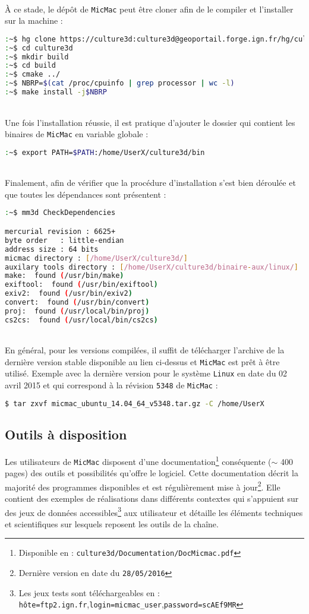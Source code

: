 \documentclass[a4paper,10pt]{article} %
\begin{document}
~\\
À ce stade, le dépôt de {\tt MicMac} peut être cloner afin de le compiler et l'installer sur la machine :
\begin{lstlisting}[language=bash]
:~$ hg clone https://culture3d:culture3d@geoportail.forge.ign.fr/hg/culture3d
:~$ cd culture3d
:~$ mkdir build
:~$ cd build
:~$ cmake ../
:~$ NBRP=$(cat /proc/cpuinfo | grep processor | wc -l)
:~$ make install -j$NBRP
\end{lstlisting}
~\\
Une fois l'installation réussie, il est pratique d'ajouter le dossier qui contient les binaires de {\tt MicMac} en variable globale :
\begin{lstlisting}[language=bash]
:~$ export PATH=$PATH:/home/UserX/culture3d/bin
\end{lstlisting}
~\\
Finalement, afin de vérifier que la procédure d’installation s'est bien déroulée et que toutes les dépendances sont présentent :
\begin{lstlisting}[language=bash]
:~$ mm3d CheckDependencies

mercurial revision : 6625+
byte order   : little-endian
address size : 64 bits
micmac directory : [/home/UserX/culture3d/]
auxilary tools directory : [/home/UserX/culture3d/binaire-aux/linux/]
make:  found (/usr/bin/make)
exiftool:  found (/usr/bin/exiftool)
exiv2:  found (/usr/bin/exiv2)
convert:  found (/usr/bin/convert)
proj:  found (/usr/local/bin/proj)
cs2cs:  found (/usr/local/bin/cs2cs)
\end{lstlisting}
~\\
En général, pour les versions compilées, il suffit de télécharger l'archive de la dernière version stable disponible au lien ci-dessus et {\tt MicMac} est prêt à être utilisé. Exemple avec la dernière version pour le système {\tt Linux} en date du 02 avril 2015 et qui correspond à la révision {\tt 5348} de {\tt MicMac} :

\begin{lstlisting}[language=bash]
$ tar zxvf micmac_ubuntu_14.04_64_v5348.tar.gz -C /home/UserX 
\end{lstlisting}

\subsection{Outils à disposition}
Les utilisateurs de {\tt MicMac} disposent d'une documentation\footnote{Disponible en : {\tt culture3d/Documentation/DocMicmac.pdf}} conséquente ($\sim$ 400 pages) des outils et possibilités qu'offre le logiciel. Cette documentation décrit la majorité des programmes disponibles et est régulièrement mise à jour\footnote{Dernière version en date du {\tt 28/05/2016}}. Elle contient des exemples de réalisations dans différents contextes qui s’appuient sur des jeux de données accessibles\footnote{Les jeux tests sont téléchargeables en : {\tt hôte=ftp2.ign.fr},{\tt login=micmac\_user},{\tt password=scAEf9MR}} aux utilisateur et détaille les éléments techniques et scientifiques sur lesquels reposent les outils de la chaîne.\newline
\end{document}
